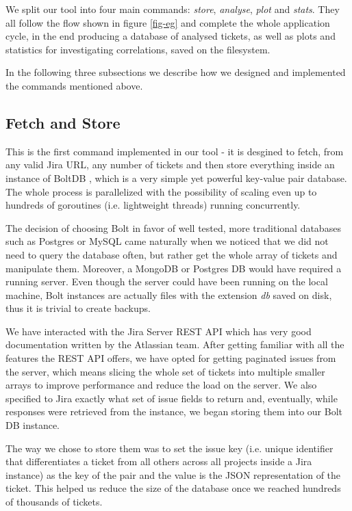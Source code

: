 \documentclass{mpaper}
\begin{document}
We split our tool into four main commands: \emph{store}, \emph{analyse}, \emph{plot} and \emph{stats}. They all 
follow the flow shown in figure \ref{fig-eg} and complete the whole application cycle, in the end producing a database 
of analysed tickets, as well as plots and statistics for investigating correlations, saved on the filesystem.

In the following three subsections we describe how we designed and implemented the commands mentioned above.

\subsection{Fetch and Store}

This is the first command implemented in our tool - it is desgined to fetch, from any valid Jira URL, any number of tickets 
and then store everything inside an instance of BoltDB \cite{bolt}, which is a very simple yet powerful key-value pair 
database. The whole process is parallelized with the possibility of scaling even up to hundreds of goroutines
(i.e. lightweight threads) running concurrently. 

The decision of choosing Bolt in favor of well tested, more traditional databases such as Postgres or MySQL came naturally when 
we noticed that we did not need to query the database often, but rather get the whole array of tickets and manipulate them. Moreover, 
a MongoDB or Postgres DB would have required a running server. Even though the server could have been running on the local machine, 
Bolt instances are actually files with the extension \emph{db} saved on disk, thus it is trivial to create backups.

We have interacted with the Jira Server REST API which has very good documentation written by the Atlassian team. After getting
familiar with all the features the REST API offers, we have opted for getting paginated issues from the server, which means 
slicing the whole set of tickets into multiple smaller arrays to improve performance and reduce the load on the server. We also
specified to Jira exactly what set of issue fields to return and, eventually, while responses were retrieved from the instance,
we began storing them into our Bolt DB instance. 

The way we chose to store them was to set the issue key (i.e. unique identifier that differentiates a ticket from all others across all 
projects inside a Jira instance) as the key of the pair and the value is the JSON representation of the ticket. This helped us reduce 
the size of the database once we reached hundreds of thousands of tickets.
\end{document}
